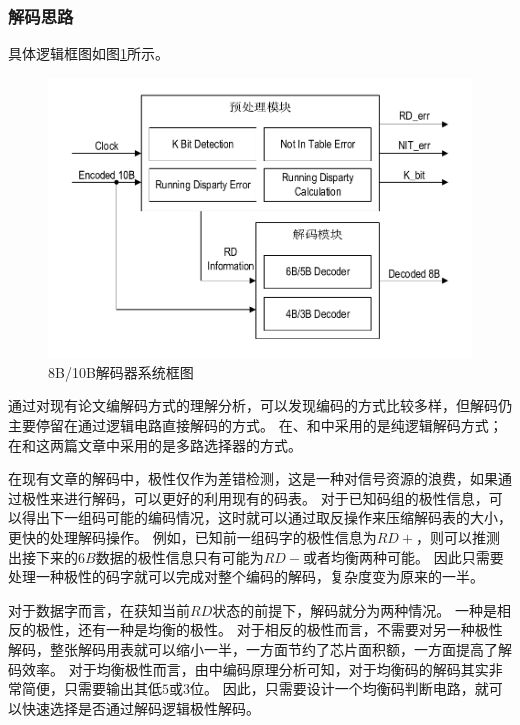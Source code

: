 \documentclass[UTF8]{ctexart}
\begin{document}
\subsubsection{解码思路}

具体逻辑框图如图\ref{fig:8b10b_decoder_diagram}所示。

\begin{figure}[H]
\centering
\includegraphics[width=14cm]{./img/8b10b_decoder_diagram.pdf}
\caption{8B/10B解码器系统框图}
\label{fig:8b10b_decoder_diagram}
\end{figure}

通过对现有论文编解码方式的理解分析，可以发现编码的方式比较多样，但解码仍主要停留在通过逻辑电路直接解码的方式。
在\cite{zhaoyh2003}、\cite{hecf2005}和\cite{Widmer1983}中采用的是纯逻辑解码方式；在\cite{wenl2007}和\cite{Actel1998}这两篇文章中采用的是多路选择器的方式。

在现有文章的解码中，极性仅作为差错检测，这是一种对信号资源的浪费，如果通过极性来进行解码，可以更好的利用现有的码表。
对于已知码组的极性信息，可以得出下一组码可能的编码情况，这时就可以通过取反操作来压缩解码表的大小，更快的处理解码操作。
例如，已知前一组码字的极性信息为$RD+$，则可以推测出接下来的$6B$数据的极性信息只有可能为$RD-$或者均衡两种可能。
因此只需要处理一种极性的码字就可以完成对整个编码的解码，复杂度变为原来的一半。

对于数据字而言，在获知当前$RD$状态的前提下，解码就分为两种情况。
一种是相反的极性，还有一种是均衡的极性。
对于相反的极性而言，不需要对另一种极性解码，整张解码用表就可以缩小一半，一方面节约了芯片面积额，一方面提高了解码效率。
对于均衡极性而言，由\cite{Widmer1983}中编码原理分析可知，对于均衡码的解码其实非常简便，只需要输出其低$5$或$3$位。
因此，只需要设计一个均衡码判断电路，就可以快速选择是否通过解码逻辑极性解码。
\end{document}
